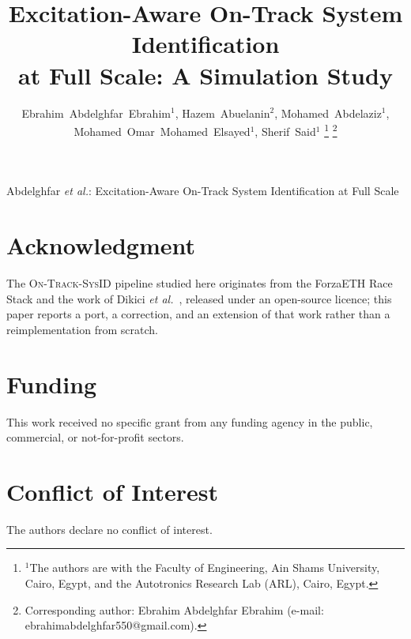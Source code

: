 \documentclass[journal]{IEEEtran}
\newcommand{\sysid}{\textsc{On-Track-SysID}}
\begin{document}
\title{Excitation-Aware On-Track System Identification\\
at Full Scale: A Simulation Study}

\author{Ebrahim~Abdelghfar~Ebrahim$^{1}$,
        Hazem~Abuelanin$^{2}$,
        Mohamed~Abdelaziz$^{1}$,
        Mohamed~Omar~Mohamed~Elsayed$^{1}$,
        Sherif~Said$^{1}$
\thanks{$^{1}$The authors are with the Faculty of Engineering, Ain Shams
University, Cairo, Egypt, and the Autotronics Research Lab (ARL), Cairo, Egypt.}
\thanks{Corresponding author: Ebrahim Abdelghfar Ebrahim (e-mail: ebrahimabdelghfar550@gmail.com).}}

%
{Abdelghfar \MakeLowercase{\textit{et al.}}: Excitation-Aware On-Track System Identification at Full Scale}

\maketitle













\appendices


\section*{Acknowledgment}
The \sysid{} pipeline studied here originates from the ForzaETH Race Stack and
the work of Dikici \emph{et al.}~\cite{ontrack2025}, released under an
open-source licence; this paper reports a port, a correction, and an extension
of that work rather than a reimplementation from scratch.

\section*{Funding}
This work received no specific grant from any funding agency in the public,
commercial, or not-for-profit sectors.

\section*{Conflict of Interest}
The authors declare no conflict of interest.
\end{document}

